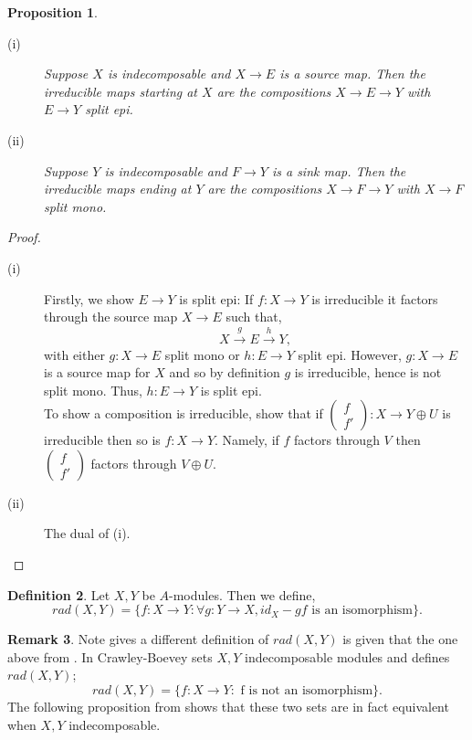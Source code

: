 \documentclass[11.5pt, twoside, a4paper, titlepage]{report}
\theoremstyle{definition}
\newtheorem{mydef}{Definition}[section]
\newtheorem{rem}[mydef]{Remark}
\theoremstyle{plain}
\newtheorem{prop}[mydef]{Proposition}
\begin{document}
\begin{prop}
\begin{description}
\item [(i)] Suppose $X$ is indecomposable and $ X \to E$ is a source map. Then the irreducible maps starting at $X$ are the compositions $X \to E \to Y$ with $E \to Y$ split epi.
\item [(ii)] Suppose $Y$ is indecomposable and $F \to Y$ is a sink map. Then the irreducible maps ending at $Y$ are the compositions $X \to F \to Y$ with $X \to F$ split mono.
\end{description}
\end{prop}
\begin{proof}
\begin{description}
\item [(i)] Firstly, we show $E \to Y$ is split epi: If $f: X \to Y$ is irreducible it factors through the source map $X \to E$ such that,
\begin{equation*}
X \xrightarrow{g} E \xrightarrow{h} Y,
\end{equation*}
with either $g: X \to E$ split mono or $h: E \to Y$ split epi. However, $g: X \to E$ is a source map for $X$ and so by definition $g$ is irreducible, hence is not split mono. Thus, $h: E \to Y$ is split epi. \\
To show a composition is irreducible, show that if $(\begin{smallmatrix} f \\ f' \end{smallmatrix}): X \to Y \oplus U$ is irreducible then so is $f: X \to Y$. Namely, if $f$ factors through $V$ then $(\begin{smallmatrix} f\\f' \end{smallmatrix})$ factors through $V \oplus U$.
\item [(ii)] The dual of (i).
\end{description}
\end{proof}

\begin{mydef}
Let $X,Y$ be $A$-modules. Then we define,
\begin{equation*}
rad(X,Y)=\{f: X \to Y: \forall g:Y \to X, id_X-gf\text{  is an isomorphism}\}.
\end{equation*}
\end{mydef}

\begin{rem}
Note \cite{CB3} gives a different definition of $rad(X,Y)$ is given that the one above from \cite{Vale}. In \cite{CB3} Crawley-Boevey sets $X,Y$ indecomposable modules and defines $rad(X,Y)$;
\begin{equation*}
rad(X,Y)=\{f: X \to Y: \text{ f is not an isomorphism}\}.
\end{equation*}
The following proposition from \cite{Vale} shows that these two sets are in fact equivalent when $X,Y$ indecomposable.
\end{rem}
\end{document}
